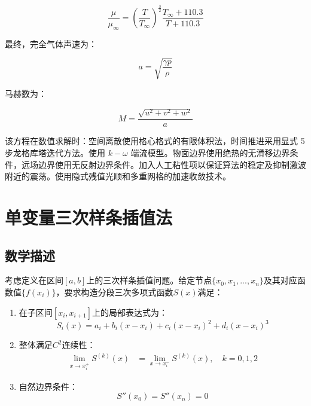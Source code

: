 \begin{equation}
\frac{\mu}{\mu_\infty} = \left( \frac{T}{T_\infty} \right)^{\frac{3}{2}} \frac{T_\infty + 110.3}{T + 110.3} 
\end{equation}

最终，完全气体声速为：

\begin{equation}
a = \sqrt{\frac{\gamma p}{\rho}} 
\end{equation}

马赫数为：

\begin{equation}
M = \frac{\sqrt{u^2 + v^2 + w^2}}{a}
\end{equation}

该方程在数值求解时：空间离散使用格心格式的有限体积法，时间推进采用显式 5 步龙格库塔迭代方法。使用 \(k-\omega\) 端流模型。物面边界使用绝热的无滑移边界条件，远场边界使用无反射边界条件。加入人工粘性项以保证算法的稳定及抑制激波附近的震荡。使用隐式残值光顺和多重网格的加速收敛技术。

\section{单变量三次样条插值法}
\subsection{数学描述}
考虑定义在区间$[a,b]$上的三次样条插值问题。给定节点$\{x_0,x_1,...,x_n\}$及其对应函数值$\{f(x_i)\}$，要求构造分段三次多项式函数$S(x)$满足：

\begin{enumerate}
    \item 在子区间$[x_i, x_{i+1}]$上的局部表达式为：
    \begin{equation}
        S_i(x) = a_i + b_i(x-x_i) + c_i(x-x_i)^2 + d_i(x-x_i)^3
    \end{equation}
    \item 整体满足$C^2$连续性：
    \begin{align}
        \lim_{x\to x_i^+} S^{(k)}(x) &= \lim_{x\to x_i^-} S^{(k)}(x), \quad k=0,1,2
    \end{align}
    \item 自然边界条件：
    \begin{equation}
        S''(x_0) = S''(x_n) = 0
    \end{equation}
\end{enumerate}
